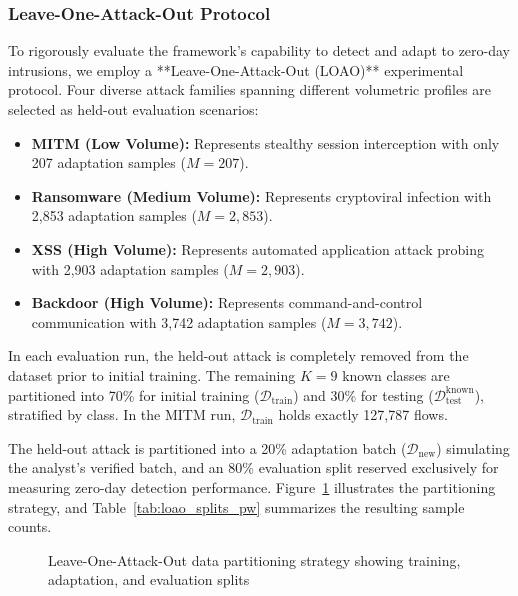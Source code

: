 \subsubsection{Leave-One-Attack-Out Protocol}
To rigorously evaluate the framework's capability to detect and adapt to zero-day intrusions, we employ a **Leave-One-Attack-Out (LOAO)** experimental protocol. Four diverse attack families spanning different volumetric profiles are selected as held-out evaluation scenarios:
\begin{itemize}
    \item \textbf{MITM (Low Volume):} Represents stealthy session interception with only 207 adaptation samples ($M = 207$).
    \item \textbf{Ransomware (Medium Volume):} Represents cryptoviral infection with 2{,}853 adaptation samples ($M = 2{,}853$).
    \item \textbf{XSS (High Volume):} Represents automated application attack probing with 2{,}903 adaptation samples ($M = 2{,}903$).
    \item \textbf{Backdoor (High Volume):} Represents command-and-control communication with 3{,}742 adaptation samples ($M = 3{,}742$).
\end{itemize}

In each evaluation run, the held-out attack is completely removed from the dataset prior to initial training. The remaining $K = 9$ known classes are partitioned into 70\% for initial training ($\mathcal{D}_{\text{train}}$) and 30\% for testing ($\mathcal{D}_{\text{test}}^{\text{known}}$), stratified by class. In the MITM run, $\mathcal{D}_{\text{train}}$ holds exactly 127{,}787 flows.

The held-out attack is partitioned into a 20\% adaptation batch ($\mathcal{D}_{\text{new}}$) simulating the analyst's verified batch, and an 80\% evaluation split reserved exclusively for measuring zero-day detection performance. Figure~\ref{fig:loao_split} illustrates the partitioning strategy, and Table~\ref{tab:loao_splits_pw} summarizes the resulting sample counts.

\begin{figure}[htpb]
  \centering
  \caption{Leave-One-Attack-Out data partitioning strategy showing training, adaptation, and evaluation splits}
  \label{fig:loao_split}
\end{figure}

